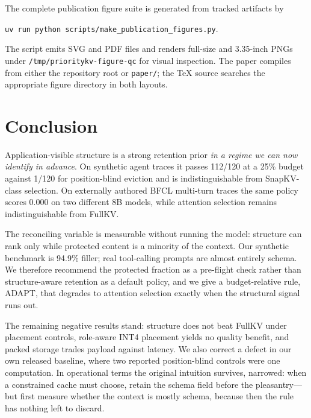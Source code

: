 \documentclass[10pt]{article}
\begin{document}
The complete publication figure suite is generated from tracked artifacts by
\begin{center}
\texttt{uv run python scripts/make\_publication\_figures.py}.
\end{center}
The script emits SVG and PDF files and renders full-size and 3.35-inch PNGs under
\texttt{/tmp/prioritykv-figure-qc} for visual inspection.  The paper compiles
from either the repository root or \texttt{paper/}; the TeX source searches the
appropriate figure directory in both layouts.

\section{Conclusion}
\label{sec:conclusion}

Application-visible structure is a strong retention prior \emph{in a regime we
can now identify in advance}.  On synthetic agent traces it passes 112/120 at a
25\% budget against 1/120 for position-blind eviction and is indistinguishable
from SnapKV-class selection.  On externally authored BFCL multi-turn traces the
same policy scores 0.000 on two different 8B models, while attention selection
remains indistinguishable from FullKV.

The reconciling variable is measurable without running the model: structure can
rank only while protected content is a minority of the context.  Our synthetic
benchmark is 94.9\% filler; real tool-calling prompts are almost entirely
schema.  We therefore recommend the protected fraction as a pre-flight check
rather than structure-aware retention as a default policy, and we give a
budget-relative rule, ADAPT, that degrades to attention selection exactly when
the structural signal runs out.

The remaining negative results stand: structure does not beat FullKV under
placement controls, role-aware INT4 placement yields no quality benefit, and
packed storage trades payload against latency.  We also correct a defect in our
own released baseline, where two reported position-blind controls were one
computation.  In operational terms the original intuition survives, narrowed:
when a constrained cache must choose, retain the schema field before the
pleasantry---but first measure whether the context is mostly schema, because then
the rule has nothing left to discard.
\end{document}
